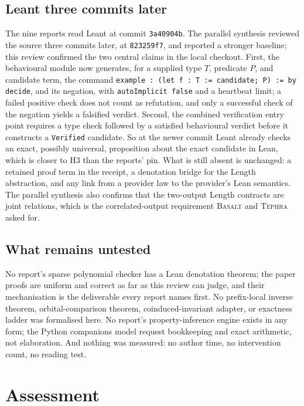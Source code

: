 \documentclass[11pt,a4paper]{article}
\newcommand{\code}[1]{\nolinkurl{#1}}
\newcommand{\Bs}{\textsc{Basalt}}
\newcommand{\Tp}{\textsc{Tephra}}
\theoremstyle{definition}
\begin{document}
\subsection{Leant three commits later}\label{sec:leant-newer}
The nine reports read Leant at commit \code{3a40904b}. The parallel synthesis reviewed the source three commits later, at \code{823259f7}, and reported a stronger baseline; this review confirmed the two central claims in the local checkout. First, the behavioural module now generates, for a supplied type $T$, predicate $P$, and candidate term, the command \code{example : (let f : T := candidate; P) := by decide}, and its negation, with \code{autoImplicit false} and a heartbeat limit; a failed positive check does not count as refutation, and only a successful check of the negation yields a falsified verdict. Second, the combined verification entry point requires a type check followed by a satisfied behavioural verdict before it constructs a \code{Verified} candidate. So at the newer commit Leant already checks an exact, possibly universal, proposition about the exact candidate in Lean, which is closer to H3 than the reports' pin. What is still absent is unchanged: a retained proof term in the receipt, a denotation bridge for the Length abstraction, and any link from a provider law to the provider's Lean semantics. The parallel synthesis also confirms that the two-output Length contracts are joint relations, which is the correlated-output requirement \Bs{} and \Tp{} asked for.

\subsection{What remains untested}
No report's sparse polynomial checker has a Lean denotation theorem; the paper proofs are uniform and correct as far as this review can judge, and their mechanisation is the deliverable every report names first. No prefix-local inverse theorem, orbital-comparison theorem, coinduced-invariant adapter, or exactness ladder was formalised here. No report's property-inference engine exists in any form; the Python companions model request bookkeeping and exact arithmetic, not elaboration. And nothing was measured: no author time, no intervention count, no reading test.

\section{Assessment}\label{sec:assessment}
\end{document}
